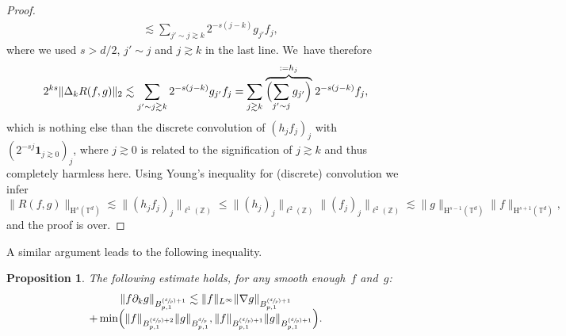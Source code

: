 \documentclass[JEP,XML,SOM,Unicode,published]{cedram}
\newcommand{\Psfrac}[2]{(\sfrac{#1}{#2})}
\newtheorem{prop}{Proposition}[section]
\theoremstyle{definition}
\newcommand\Z{\mathbb{Z}}
\newcommand\T{\mathbb{T}}
\renewcommand\H{\mathrm{H}}
\begin{document}
\begin{proof}
\begin{align*}
&\lesssim \sum_{j'\sim j \gtrsim k} 2^{-s(j-k)} g_{j'} f_j,
\end{align*}
where we used $s>d/2$, $j'\sim j$ and $j\gtrsim k$ in the last line. We~have therefore
\[
2^{ks}\|\Delta_k R(f,g)\|_2 \lesssim \sum_{j'\sim j \gtrsim k} 2^{-s(j-k)} g_{j'} f_j = \sum_{j\gtrsim k} \stackrel{:=h_j}{\overbrace{\Bigl(\sum_{j'\sim j} g_{j'}\Bigr)}}2^{-s(j-k)}f_j,
\]
which is nothing else than the discrete convolution of $(h_j f_j)_j$ with $(2^{-sj}\mathbf{1}_{j\gtrsim 0})_j$, where $j\gtrsim 0$ is related to the signification of $j\gtrsim k$ and thus completely harmless here. Using Young's inequality for (discrete) convolution we infer
\[
\|R(f,g)\|_{\H^s(\T^d)}\lesssim \|(h_j f_j)_j\|_{\ell^1(\Z)} \leq \|(h_j)_j\|_{\ell^2(\Z)}\|(f_j)_j\|_{\ell^2(\Z)} \lesssim \|g\|_{\H^{s-1}(\T^d)}\|f\|_{\H^{s+1}(\T^d)},
\]
and the proof is over.
\end{proof}
A similar argument leads to the following inequality.
\begin{prop}\label{prop:rhsBesov}
The following estimate holds, for any smooth enough~$f$ and~$g$:
\begin{multline*}
\|f \partial_k g\|_{ B^{\Psfrac dp+1}_{p,1}} \lesssim \|f\|_{L^\infty } \|\nabla g\|_{ B^{\Psfrac dp+1}_{p,1}}\\[-5pt]
+\min \Bigl(
\| f\|_{B^{\Psfrac dp+2}_{p,1}} \|g\|_{B^{\sfrac dp}_{p,1}}, \| f\|_{B^{\Psfrac dp+1}_{p,1}} \|g\|_{B^{\Psfrac dp+1}_{p,1}} \Bigr).
\end{multline*}
\end{prop}
\end{document}
